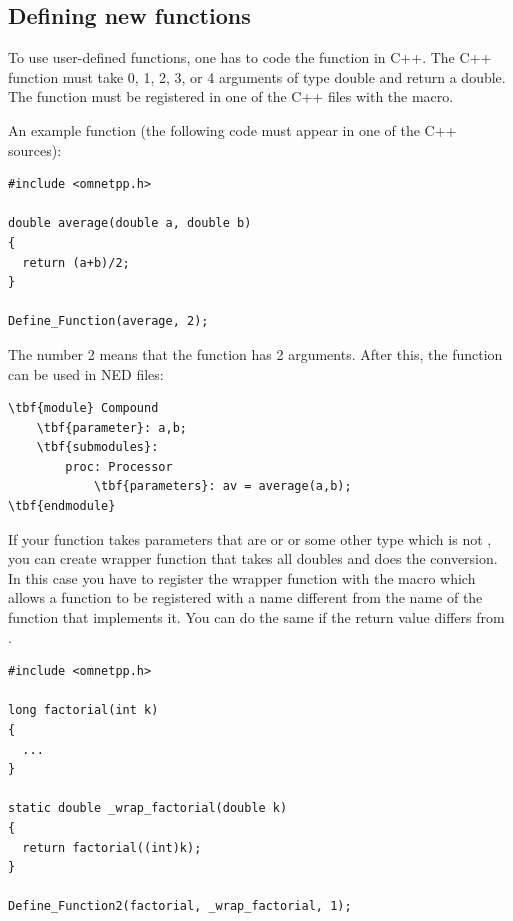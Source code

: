 \subsection{Defining new functions}
\label{sec:ch-ned-lang:defining-functions}

To use user-defined functions, one has
to code the function in C++.  The C++ function must take 0, 1, 2, 3, or 4
arguments of type double and return a double. The function must be
registered in one of the C++ files with the 
macro.

An example function (the following code must appear in one of the C++
sources):


\begin{verbatim}
#include <omnetpp.h>

double average(double a, double b)
{
  return (a+b)/2;
}

Define_Function(average, 2);
\end{verbatim}


The number 2 means that the  function has 2
arguments.  After this, the  function can be used in
NED files:


\begin{Verbatim}[commandchars=\\\{\}]
\tbf{module} Compound
    \tbf{parameter}: a,b;
    \tbf{submodules}:
        proc: Processor
            \tbf{parameters}: av = average(a,b);
\tbf{endmodule}
\end{Verbatim}


If your function takes parameters that are  or  or
some other type which is not , you can create wrapper function
that takes all doubles and does the conversion. In this case you have
to register the wrapper function with the  macro
which allows a function to be registered with a name different from the
name of the function that implements it. You can do the same
if the return value differs from .

\begin{verbatim}
#include <omnetpp.h>

long factorial(int k)
{
  ...
}

static double _wrap_factorial(double k)
{
  return factorial((int)k);
}

Define_Function2(factorial, _wrap_factorial, 1);
\end{verbatim}




